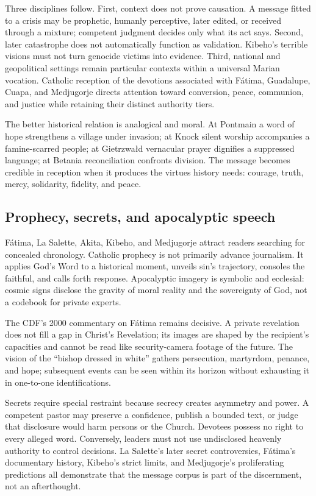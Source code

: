 Three disciplines follow. First, context does not prove causation. A message fitted to a crisis may be prophetic, humanly perceptive, later edited, or received through a mixture; competent judgment decides only what its act says. Second, later catastrophe does not automatically function as validation. Kibeho's terrible visions must not turn genocide victims into evidence. Third, national and geopolitical settings remain particular contexts within a universal Marian vocation. Catholic reception of the devotions associated with Fátima, Guadalupe, Cuapa, and Medjugorje directs attention toward conversion, peace, communion, and justice while retaining their distinct authority tiers.

The better historical relation is analogical and moral. At Pontmain a word of hope strengthens a village under invasion; at Knock silent worship accompanies a famine-scarred people; at Gietrzwałd vernacular prayer dignifies a suppressed language; at Betania reconciliation confronts division. The message becomes credible in reception when it produces the virtues history needs: courage, truth, mercy, solidarity, fidelity, and peace.

\subsection{Prophecy, secrets, and apocalyptic speech}

Fátima, La Salette, Akita, Kibeho, and Medjugorje attract readers searching for concealed chronology. Catholic prophecy is not primarily advance journalism. It applies God's Word to a historical moment, unveils sin's trajectory, consoles the faithful, and calls forth response. Apocalyptic imagery is symbolic and ecclesial: cosmic signs disclose the gravity of moral reality and the sovereignty of God, not a codebook for private experts.

The CDF's 2000 commentary on Fátima remains decisive. A private revelation does not fill a gap in Christ's Revelation; its images are shaped by the recipient's capacities and cannot be read like security-camera footage of the future. The vision of the ``bishop dressed in white'' gathers persecution, martyrdom, penance, and hope; subsequent events can be seen within its horizon without exhausting it in one-to-one identifications.

Secrets require special restraint because secrecy creates asymmetry and power. A competent pastor may preserve a confidence, publish a bounded text, or judge that disclosure would harm persons or the Church. Devotees possess no right to every alleged word. Conversely, leaders must not use undisclosed heavenly authority to control decisions. La Salette's later secret controversies, Fátima's documentary history, Kibeho's strict limits, and Medjugorje's proliferating predictions all demonstrate that the message corpus is part of the discernment, not an afterthought.

